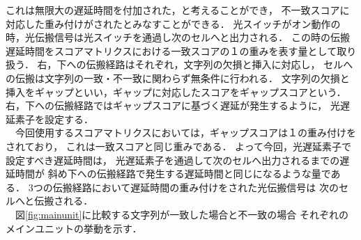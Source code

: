 \begin{description}
これは無限大の遅延時間を付加された，と考えることができ，
不一致スコアに対応した重み付けがされたとみなすことができる．
光スイッチがオン動作の時，光伝搬信号は光スイッチを通過し次のセルへと出力される．
この時の伝搬遅延時間をスコアマトリクスにおける一致スコアの１の重みを表す量として取り扱う．
右，下への伝搬経路はそれぞれ，文字列の欠損と挿入に対応し，
セルへの伝搬は文字列の一致・不一致に関わらず無条件に行われる．
文字列の欠損と挿入をギャップといい，ギャップに対応したスコアをギャップスコアという．
右，下への伝搬経路ではギャップスコアに基づく遅延が発生するように，
光遅延素子を設定する．\\
\ \ 今回使用するスコアマトリクスにおいては，ギャップスコアは１の重み付けをされており，
これは一致スコアと同じ重みである．
よって今回，光遅延素子で設定すべき遅延時間は，
光遅延素子を通過して次のセルへ出力されるまでの遅延時間が
斜め下への伝搬経路で発生する遅延時間と同じになるような量である．
3つの伝搬経路において遅延時間の重み付けをされた光伝搬信号は
次のセルへと伝搬される．\\
\ \ 図\ref{fig:mainunit}に比較する文字列が一致した場合と不一致の場合
それぞれのメインユニットの挙動を示す．
\begin{figure}[t!]
\begin{center}
\subfigure[比較する文字列が不一致の場合のメインユニットの挙動]{
}
\end{center}
\end{figure}
\end{description}
